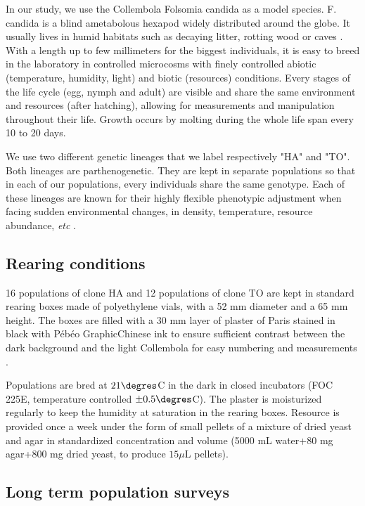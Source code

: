 In our study, we use the Collembola Folsomia candida as a model species. F.
candida is a blind ametabolous hexapod widely distributed around the globe. It
usually lives in humid habitats such as decaying litter, rotting wood or caves
\autocites{fountain2005a}. With a length up to few millimeters for the biggest
individuals, it is easy to breed in the laboratory in controlled microcosms with
finely controlled abiotic (temperature, humidity, light) and biotic (resources)
conditions. Every stages of the life cycle (egg, nymph and adult) are visible
and share the same environment and resources (after hatching), allowing for
measurements and manipulation throughout their life. Growth occurs by molting
during the whole life span every 10 to 20 days.

We use two different genetic lineages that we label respectively "HA" and "TO".
Both lineages are parthenogenetic. They are kept in separate populations so that
in each of our populations, every individuals share the same genotype. Each of
these lineages are known for their highly flexible phenotypic adjustment when
facing sudden environmental changes, in density, temperature, resource
abundance, \textit{etc} \autocites{tully2008a,mallard2013b}.

\subsection{Rearing conditions}

16 populations of clone HA and 12 populations of clone TO are kept in standard
rearing boxes made of polyethylene vials, with a 52 mm diameter and a 65 mm
height. The boxes are filled with a 30 mm layer of plaster of Paris stained in
black with Pébéo Graphic\circledR Chinese ink to ensure sufficient contrast between the
dark background and the light Collembola for easy numbering and measurements
\autocites{tully2008a,mallard2013a}.

Populations are bred at $21\degres$C in the dark in closed incubators (FOC 225E,
temperature controlled $\pm 0.5\degres$C). The plaster is moisturized regularly
to keep the humidity at saturation in the rearing boxes. Resource is provided once a week
under the form of small pellets of a mixture of dried yeast and agar in
standardized concentration and volume (5000 mL water+80 mg agar+800 mg dried
yeast, to produce $15 \mu$L pellets).

\subsection{Long term population surveys}

